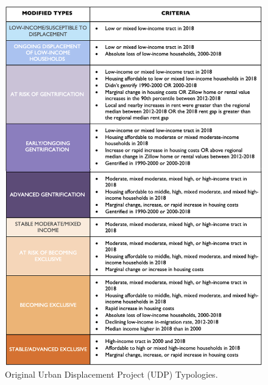 \documentclass[12pt]{article}
\begin{document}
\begin{figure}%
  \centering %
  \includegraphics[height=0.95\textheight]{images/typology_sheet_2018}
  \captionsetup{justification=centering, singlelinecheck=false, margin=2cm}
  \caption[UDP Displacement Typologies]{Original Urban Displacement Project (UDP) Typologies.}
  \label{fig:original_udp}
\end{figure}

\clearpage
\sloppy


\titleformat{\section}{\fontsize{12}{14}\bfseries\centering}{\thesection}{0.5em}{}
\printbibliography[heading=bibintoc]
\end{document}
